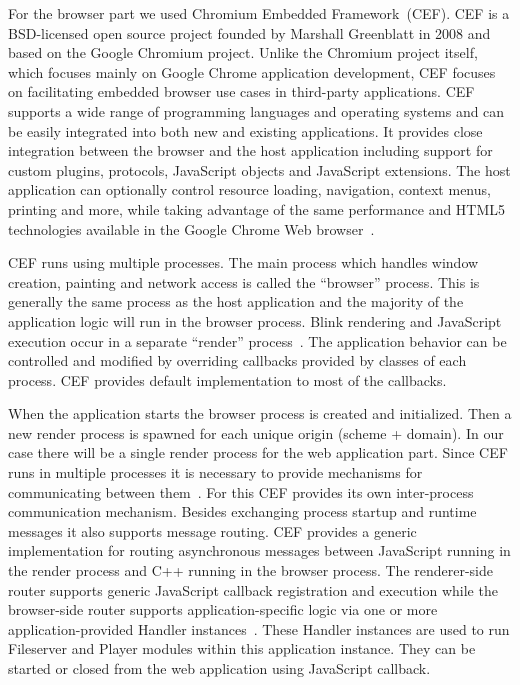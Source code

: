 For the browser part we used Chromium Embedded Framework~(CEF). CEF is a BSD-licensed open source project founded by Marshall Greenblatt in 2008 and based on the Google Chromium project. Unlike the Chromium project itself, which focuses mainly on Google Chrome application development, CEF focuses on facilitating embedded browser use cases in third-party applications. CEF supports a wide range of programming languages and operating systems and can be easily integrated into both new and existing applications. It provides close integration between the browser and the host application including support for custom plugins, protocols, JavaScript objects and JavaScript extensions. The host application can optionally control resource loading, navigation, context menus, printing and more, while taking advantage of the same performance and HTML5 technologies available in the Google Chrome Web browser~\citep{cefGithub}.
\par
CEF runs using multiple processes. The main process which handles window creation, painting and network access is called the “browser” process. This is generally the same process as the host application and the majority of the application logic will run in the browser process. Blink rendering and JavaScript execution occur in a separate “render” process~\citep{cefTutorial}. The application behavior can be controlled and modified by overriding callbacks provided by classes of each process. CEF provides default implementation to most of the callbacks.
\par
When the application starts the browser process is created and initialized. Then a new render process is spawned for each unique origin (scheme + domain). In our case there will be a single render process for the web application part. Since CEF runs in multiple processes it is necessary to provide mechanisms for communicating between them~\citep{cefTutorial}. For this CEF provides its own inter-process communication mechanism. Besides exchanging process startup and runtime messages it also supports message routing. CEF provides a generic implementation for routing asynchronous messages between JavaScript running in the render process and C++ running in the browser process. The renderer-side router supports generic JavaScript callback registration and execution while the browser-side router supports application-specific logic via one or more application-provided Handler instances~\citep{cefTutorial}. These Handler instances are used to run Fileserver and Player modules within this application instance. They can be started or closed from the web application using JavaScript callback.

